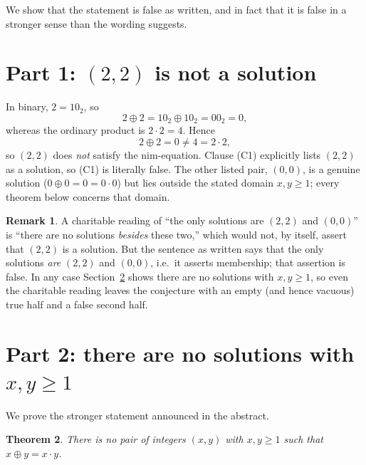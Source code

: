 \documentclass[11pt]{article}
\newtheorem{theorem}{Theorem}
\theoremstyle{definition}
\newtheorem{remark}[theorem]{Remark}
\newcommand{\xor}{\oplus}
\begin{document}
We show that the statement is false as written, and in fact that it is false
in a stronger sense than the wording suggests.

\section{Part 1: $(2,2)$ is not a solution}\label{sec:twotwo}

In binary, $2 = 10_{2}$, so
\[
  2 \xor 2 = 10_{2} \xor 10_{2} = 00_{2} = 0 ,
\]
whereas the ordinary product is $2 \cdot 2 = 4$.  Hence
\[
  2 \xor 2 = 0 \ne 4 = 2 \cdot 2 ,
\]
so $(2,2)$ does \emph{not} satisfy the nim-equation.  Clause (C1) explicitly
lists $(2,2)$ as a solution, so (C1) is literally false.  The other listed
pair, $(0,0)$, is a genuine solution ($0 \xor 0 = 0 = 0 \cdot 0$) but lies
outside the stated domain $x, y \ge 1$; every theorem below concerns that
domain.

\begin{remark}
A charitable reading of ``the only solutions are $(2,2)$ and $(0,0)$'' is
``there are no solutions \emph{besides} these two,'' which would not, by
itself, assert that $(2,2)$ is a solution.  But the sentence as written says
that the only solutions \emph{are} $(2,2)$ and $(0,0)$, i.e.\ it asserts
membership; that assertion is false.  In any case Section~\ref{sec:none}
shows there are no solutions with $x, y \ge 1$, so even the charitable
reading leaves the conjecture with an empty (and hence vacuous) true half and
a false second half.
\end{remark}

\section{Part 2: there are no solutions with $x, y \ge 1$}\label{sec:none}

We prove the stronger statement announced in the abstract.

\begin{theorem}\label{thm:none}
There is no pair of integers $(x, y)$ with $x, y \ge 1$ such that
$x \xor y = x \cdot y$.
\end{theorem}
\end{document}
